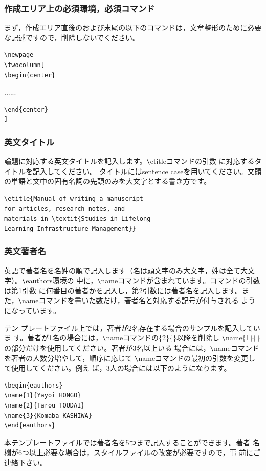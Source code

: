 \documentclass[b5paper,10pt,twocolumn,tombow]{jarticle}
\begin{document}
\subsubsection{作成エリア上の必須環境，必須コマンド}
まず，作成エリア直後のおよび末尾の以下のコマンドは，文章整形のために必要
な記述ですので，削除しないでください。
\begin{verbatim}
\newpage
\twocolumn[
\begin{center}
\end{verbatim}
......
\begin{verbatim}
\end{center}
]
\end{verbatim}


\subsubsection{英文タイトル}
論題に対応する英文タイトルを記入します。\verb|\|etitleコマンドの引数
に対応するタイトルを記入してください。
タイトルにはsentence caseを用いてください。文頭の単語と文中の固有名詞の先頭のみを大文字とする書き方です。

\begin{verbatim}
\etitle{Manual of writing a manuscript
for articles, research notes, and
materials in \textit{Studies in Lifelong
Learning Infrastructure Management}}
\end{verbatim}

\subsubsection{英文著者名}
英語で著者名を名姓の順で記入します（名は頭文字のみ大文字，姓は全て大文字）。\verb|\|eauthors環境の
中に，\verb|\|nameコマンドが含まれています。コマンドの引数は第1引数
に何番目の著者かを記入し，第2引数には著者名を記入します。ま
た，\verb|\|nameコマンドを書いた数だけ，著者名と対応する記号が付与される
ようになっています。


テン
プレートファイル上では，著者が2名存在する場合のサンプルを記入していま
す。著者が1名の場合には，\verb|\|nameコマンドの\{2\}\{\}以降を削除し
\verb|\|name\{1\}\{\}の部分だけを使用してください。著者が3名以上いる
場合には，\verb|\|nameコマンドを著者の人数分増やして，順序に応じて
\verb|\|nameコマンドの最初の引数を変更して使用してください。例え
ば，3人の場合には以下のようになります。
\begin{verbatim}
\begin{eauthors}
\name{1}{Yayoi HONGO}
\name{2}{Tarou TOUDAI}
\name{3}{Komaba KASHIWA}
\end{eauthors}
\end{verbatim}
本テンプレートファイルでは著者名を5つまで記入することができます。著者
名欄が6つ以上必要な場合は，スタイルファイルの改変が必要ですので，事
前にご連絡下さい。
\end{document}
